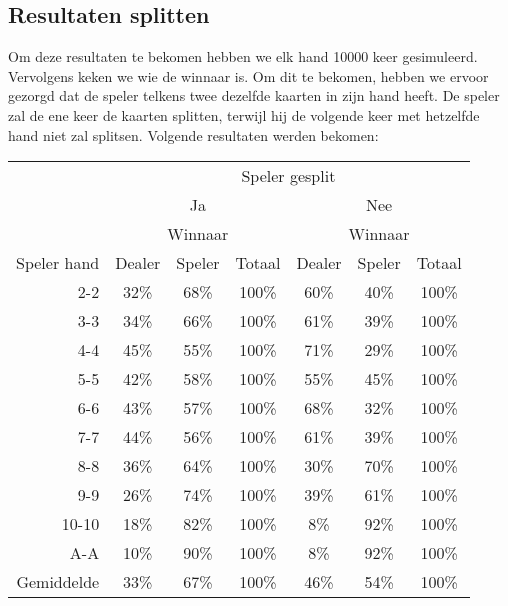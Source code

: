 \documentclass[11pt, final, journal, a4paper]{IEEEtran}
\begin{document}
\subsection{Resultaten splitten}
Om deze resultaten te bekomen hebben we elk hand 10000 keer gesimuleerd. Vervolgens keken we wie de winnaar is. Om dit te bekomen, hebben we ervoor gezorgd dat de speler telkens twee dezelfde kaarten in zijn hand heeft. De speler zal de ene keer de kaarten splitten, terwijl hij de volgende keer met hetzelfde hand niet zal splitsen.
Volgende resultaten werden bekomen:\\
\begin{table}[h]
\begin{tabular}{c||c|c||c||c|c||c|}
\multicolumn{1}{l||}{}       							& \multicolumn{6}{c|}{Speler gesplit}                            \\ \cline{2-7} 
																					& \multicolumn{3}{c||}{Ja}      & \multicolumn{3}{c|}{Nee}       \\ \cline{2-7} 
																					& \multicolumn{3}{c||}{Winnaar} & \multicolumn{3}{c|}{Winnaar}   \\ \hline 
\multicolumn{1}{c||}{Speler hand}					& Dealer  & Speler   & Totaal  	& Dealer    & Speler  & Totaal   \\ \hline
\multicolumn{1}{r||}{2-2}   							& 32\%    & 68\%     & 100\%   	& 60\%     	& 40\%    & 100\%    \\ \hline
\multicolumn{1}{r||}{3-3}   							& 34\%    & 66\%     & 100\%   	& 61\%     	& 39\%    & 100\%    \\ \hline
\multicolumn{1}{r||}{4-4}   							& 45\%    & 55\%     & 100\%   	& 71\%     	& 29\%    & 100\%    \\ \hline
\multicolumn{1}{r||}{5-5}   							& 42\%    & 58\%     & 100\%   	& 55\%     	& 45\%    & 100\%    \\ \hline
\multicolumn{1}{r||}{6-6}   							& 43\%    & 57\%     & 100\%   	& 68\%     	& 32\%    & 100\%    \\ \hline
\multicolumn{1}{r||}{7-7}   							& 44\%    & 56\%     & 100\%   	& 61\%     	& 39\%    & 100\%    \\ \hline
\multicolumn{1}{r||}{8-8}   							& 36\%    & 64\%     & 100\%   	& 30\%     	& 70\%    & 100\%    \\ \hline
\multicolumn{1}{r||}{9-9}   							& 26\%    & 74\%     & 100\%   	& 39\%     	& 61\%    & 100\%    \\ \hline
\multicolumn{1}{r||}{10-10} 							& 18\%    & 82\%     & 100\%   	& 8\%      	& 92\%    & 100\%    \\ \hline
\multicolumn{1}{r||}{A-A}   							& 10\%    & 90\%     & 100\%   	& 8\%      	& 92\%    & 100\%    \\	\hline \hline
\multicolumn{1}{r||}{Gemiddelde}					& 33\%		& 67\%		 & 100\%   	& 46\%			& 54\%		& 100\%		 \\
\end{tabular}
\end{table}
\\
\end{document}
